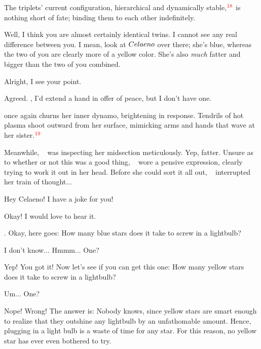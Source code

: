 \documentclass[main.tex]{subfiles}
\begin{document}
\par \nar The triplets' current configuration, hierarchical and dynamically stable,$^{\textcolor{red}{18}}$ is nothing short of fate; binding them to each other indefinitely.

\par \Maia Well, I think you are almost certainly identical twins.  I cannot see any real difference between you.  I mean, look at $Celaeno$ over there; she's blue, whereas the two of you are clearly more of a yellow color.  She's also \textit{much} fatter and bigger than the two of you combined.  

\par \Celaeno Alright, I see your point.

\par \Taygete Agreed.  \rmalcyone, I'd extend a hand in offer of peace, but I don't have one.

\par \nar \rmtaygete once again churns her inner dynamo, brightening in response.  Tendrils of hot plasma shoot outward from her surface, mimicking arms and hands that wave at her sister.$^{\textcolor{red}{19}}$

\par \nar Meanwhile, \rmcelaeno~ was inspecting her midsection meticulously.  Yep, fatter.  Unsure as to whether or not this was a good thing, \rmcelaeno~ wore a pensive expression, clearly trying to work it out in her head.  Before she could sort it all out, \rmtaygete~ interrupted her train of thought...

\par \Taygete Hey Celaeno!  I have a joke for you!

\par \Celaeno Okay!  I would love to hear it.

\par \Taygete. Okay, here goes:  How many blue stars does it take to screw in a lightbulb?

\par \Celaeno I don't know... Hmmm... One?

\par \Taygete Yep!  You got it!  Now let's see if you can get this one:  How many yellow stars does it take to screw in a lightbulb?

\par \Celaeno Um... One?

\par \Taygete Nope!  Wrong!  The answer is:  Nobody knows, since yellow stars are smart enough to realize that they outshine any lightbulb by an unfathomable amount.   Hence, plugging in a light bulb is a waste of time for any star. For this reason, no yellow star has ever even bothered to try.
\end{document}
